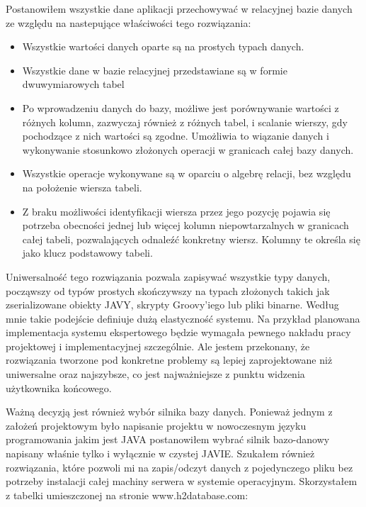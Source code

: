 Postanowiłem wszystkie dane aplikacji przechowywać w relacyjnej bazie danych ze względu na nastepujące właściwości tego rozwiązania:
\begin{itemize}
 \item Wszystkie wartości danych oparte są na prostych typach danych.
 \item Wszystkie dane w bazie relacyjnej przedstawiane są w formie dwuwymiarowych tabel
 \item Po wprowadzeniu danych do bazy, możliwe jest porównywanie wartości z różnych kolumn, zazwyczaj również z różnych tabel, i scalanie wierszy, gdy pochodzące z nich wartości są zgodne. Umożliwia to wiązanie danych i wykonywanie stosunkowo złożonych operacji w granicach całej bazy danych.
 \item Wszystkie operacje wykonywane są w oparciu o algebrę relacji, bez względu na położenie wiersza tabeli.
 \item Z braku możliwości identyfikacji wiersza przez jego pozycję pojawia się potrzeba obecności jednej lub więcej kolumn niepowtarzalnych w granicach całej tabeli, pozwalających odnaleźć konkretny wiersz. Kolumny te określa się jako klucz podstawowy tabeli.
\end{itemize}
Uniwersalność tego rozwiązania pozwala zapisywać wszystkie typy danych, począwszy od typów prostych skończywszy na typach złożonych takich jak zserializowane obiekty JAVY, skrypty Groovy'iego lub pliki binarne. Według mnie takie podejście definiuje dużą elastyczność systemu. Na przykład planowana implementacja systemu ekspertowego będzie wymagała pewnego nakładu pracy projektowej i implementacyjnej szczególnie. Ale jestem przekonany, że rozwiązania tworzone pod konkretne problemy są lepiej zaprojektowane niż uniwersalne oraz najszybsze, co jest najważniejsze z punktu widzenia użytkownika końcowego.

Ważną decyzją jest również wybór silnika bazy danych. Ponieważ jednym z założeń projektowym było napisanie projektu w nowoczesnym języku programowania jakim jest JAVA postanowiłem wybrać silnik bazo-danowy napisany właśnie tylko i wyłącznie w czystej JAVIE. Szukałem również rozwiązania, które pozwoli mi na zapis/odczyt danych z pojedynczego pliku bez potrzeby instalacji całej machiny serwera w systemie operacyjnym. Skorzystałem z tabelki umieszczonej na stronie www.h2database.com:

